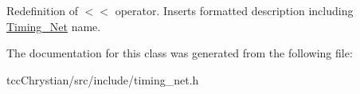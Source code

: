 Redefinition of $<$$<$ operator. Inserts formatted description including \hyperlink{classTiming__Analysis_1_1Timing__Net}{Timing\-\_\-\-Net} name. 



The documentation for this class was generated from the following file\-:\begin{DoxyCompactItemize}
\item 
tcc\-Chrystian/src/include/timing\-\_\-net.\-h\end{DoxyCompactItemize}
